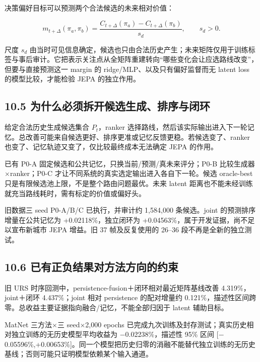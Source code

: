 \documentclass[UTF8,10pt,a4paper,fontset=fandol]{ctexart}
\begin{document}
决策偏好目标可以预测两个合法候选的未来相对价值：


\begin{equation}
m_{t+\Delta}(\pi_a,\pi_b)=
\frac{C_{t+\Delta}(\pi_a)-C_{t+\Delta}(\pi_b)}{s_d},
\qquad s_d>0.
\end{equation}

尺度 \ensuremath{s_{d}} 由当时可见信息确定，候选也只由合法历史产生；未来矩阵仅用于训练标签与事后审计。它把表示关注点从全矩阵重建转向“哪些变化会让应选路线改变”，但要与直接预测这一 margin 的 ridge/\allowbreak{}MLP、以及只有偏好监督而无 latent loss 的模型比较，才能检验 JEPA 的独立作用。


\subsection*{10.5 为什么必须拆开候选生成、排序与闭环}


给定合法历史生成候选集合 \ensuremath{P_{t}}，ranker 选择路线，然后该实际输出进入下一轮记忆。总改善可能来自候选更好、排序更准或记忆反馈更稳。若候选变了、ranker 也变了、记忆轨迹又变了，仅比较最终成本无法确定 JEPA 的作用。


已有 P0-A 固定候选和公共记忆，只换当前/\allowbreak{}预测/\allowbreak{}真未来评分；P0-B 比较生成器\ensuremath{\times}ranker；P0-C 才让不同系统的真实选定输出进入各自下一轮。候选 oracle-best 只是有限候选池上限，不是整个路由问题最优。未来 latent 距离也不能未经训练就充当路线耗时，需有标定的价值或偏好头。


旧数据三 seed P0-A/\allowbreak{}B/\allowbreak{}C 已执行，并审计约 1,584,000 条候选。joint 的预测排序增量在公共记忆为 +0.02118\%，独立闭环为 +0.04563\%，属于开发证据，尚不足以宣布新城市 JEPA 增益。旧 37 帧及反复使用的 26–36 段不再是全新的独立测试。


\subsection*{10.6 已有正负结果对方法方向的约束}


旧 URS 时序回测中，persistence-fusion＋闭环相对最近矩阵基线改善 4.319\%，joint＋闭环 4.437\%；joint 相对 persistence 的配对增量约 0.121\%，描述性区间跨零。总收益主要证据指向融合/\allowbreak{}记忆，不能全部归因于 latent 辅助目标。


MatNet 三方法\ensuremath{\times}三 seed\ensuremath{\times}2,000 epochs 已完成九次训练及封存测试；真实历史相对独立训练的无历史模型平均收益为 \ensuremath{-}0.02238\%，描述性 95\% 区间 [\ensuremath{-}0.05596\%,+0.00653\%]。同一个模型把历史归零的消融不能替代独立训练的无历史基线；否则可能只证明模型依赖某个输入通道。
\end{document}
